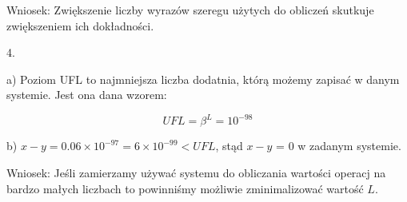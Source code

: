 \documentclass[10pt]{article}
\begin{document}
Wniosek: Zwiększenie liczby wyrazów szeregu użytych do obliczeń skutkuje zwiększeniem ich dokładności.

\vspace{4cm}
4.

a) Poziom UFL to najmniejsza liczba dodatnia, którą możemy zapisać w danym systemie. Jest ona dana wzorem:

$$
U F L=\beta^{L}=10^{-98}
$$

b) $x-y=0.06 \times 10^{-97}=6 \times 10^{-99}<U F L$, stąd   $x-y$ = 0 w zadanym systemie.

Wniosek: Jeśli zamierzamy używać systemu do obliczania wartości operacj na bardzo małych liczbach to powinniśmy możliwie zminimalizować wartość $L$.
\end{document}
